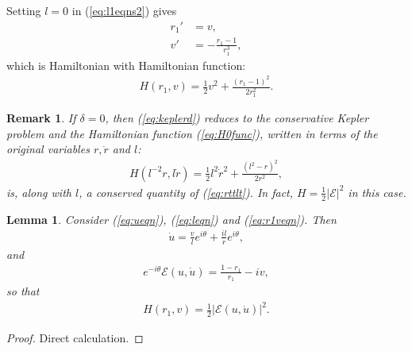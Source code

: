 \documentclass[reqno,12pt]{amsart}
\newcommand{\eqlab}[1]{\label{eq:#1}}
\renewcommand{\eqref}[1]{(\ref{eq:#1})}
\newcommand{\remlab}[1]{\label{remark:#1}}
\newtheorem{lemma}[theorem]{Lemma}
\newtheorem{remark}[theorem]{Remark}
\numberwithin{equation}{section}
\begin{document}
Setting $l=0$ in \eqref{l1eqns2} gives
\begin{equation}\eqlab{r1veqns}
\begin{aligned}
 r_1' &= v,\\
 v' &=-\frac{r_1-1}{r_1^3},
\end{aligned}
\end{equation}
which is Hamiltonian with Hamiltonian function:
\begin{align}
 H(r_1,v) = \frac12 v^2+\frac{(r_1-1)^2}{2r_1^2}.\eqlab{H0func}%
\end{align}

\begin{remark}\remlab{delta0}
If $\delta=0$, then \eqref{keplerd} reduces to the conservative Kepler problem and the Hamiltonian function \eqref{H0func}, written in terms of the original variables $r,\dot r$ and $l$:
\begin{align*}
 H(l^{-2} r,l\dot r) = \frac12 l^{2} \dot r^2+\frac{(l^2-r)^2}{2r^2},
\end{align*}
is, along with $l$, a conserved quantity of \eqref{rttlt}. In fact, $H=\frac12 \vert \mathcal E\vert^2$ in this case. 
\end{remark}

\begin{lemma}
Consider \eqref{ueqn}, \eqref{leqn} and \eqref{r1veqn}. Then 
\begin{align*}
 \dot u = \frac{v}{l}e^{i\theta}+\frac{il}{r}e^{i\theta},
\end{align*}
and 
\begin{align*}
 e^{-i\theta} \mathcal E(u,\dot u) = \frac{1-r_1}{r_1}-iv,
\end{align*}
so that
\begin{align}
H(r_1,v)=\frac12 \vert \mathcal E(u,\dot u)\vert^2.\eqlab{HvsMathcalE}
\end{align}


\end{lemma}
\begin{proof}
 Direct calculation.
\end{proof}
\end{document}
